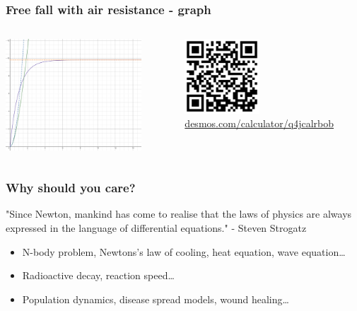 \documentclass[aspectratio=169, t]{beamer}
\begin{document}
\begin{frame}
	\frametitle{Free fall with air resistance - graph}
	\begin{columns}[T]
		\includegraphics[height=0.8\textheight]{images/free-fall-with-air-resistance-graph.png}

		\begin{figure}
			\includegraphics[width=0.5\textwidth]{images/free-fall-with-air-resistance-graph-qr-code.png}
			\tiny
			\caption{\href{https://www.desmos.com/calculator/q4jcalrbob}{desmos.com/calculator/q4jcalrbob}}
		\end{figure}
	\end{columns}
\end{frame}

\begin{frame}
	\frametitle{Why should you care?}
	"Since Newton, mankind has come to realise that the
	laws of physics are always expressed in the language of
	differential equations." - Steven Strogatz
	\begin{itemize}
		\item N-body problem, Newtons's law of cooling, heat equation, wave equation\dots
		\item Radioactive decay, reaction speed\dots
		\item Population dynamics, disease spread models, wound healing\dots
	\end{itemize}
\end{frame}
\end{document}

